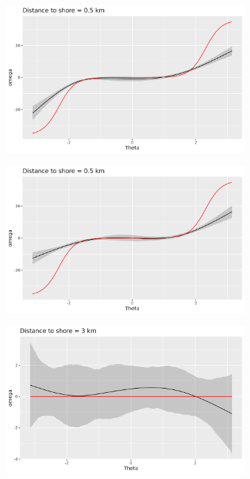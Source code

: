 \documentclass[11pt]{article}
\newcommand {\1}{\mathbb{1}}
\begin{document}
\begin{figure}[H]
	\centering
	\begin{subfigure}{0.48\textwidth}
		\centering
		\includegraphics[scale=0.3]{images/simulation study/crcvm_rect_hf_ne1_omega_close.png}
		\caption{}
	\end{subfigure}
	\begin{subfigure}{0.48\textwidth}
		\centering
		\includegraphics[scale=0.3]{images/simulation study/crcvm_rect_hf_e1_omega_close.png}
		\caption{}
	\end{subfigure}
	\begin{subfigure}{0.48\textwidth}
		\centering
		\includegraphics[scale=0.3]{images/simulation study/crcvm_rect_hf_ne1_omega_far.png}

\end{subfigure}
\end{figure}
\end{document}

